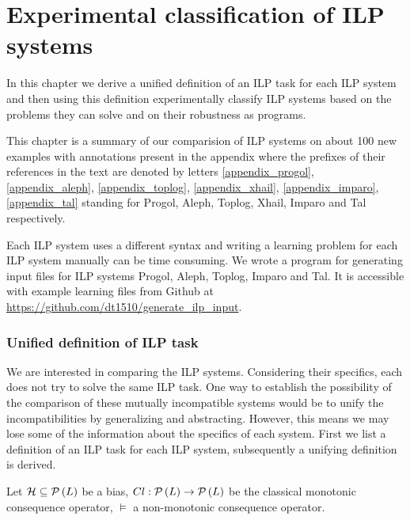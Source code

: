 \chapter{Experimental classification of ILP systems}\label{chap:classification_of_ilp_systems}
In this chapter we derive a unified definition of an ILP task for each ILP system and then using this definition experimentally classify ILP systems based on the problems they can solve and on their robustness as programs.

This chapter is a summary of our comparision of
ILP systems on about 100 new examples with annotations present in the appendix where the prefixes of their references in the text are denoted by letters
\ref{appendix_progol}, \ref{appendix_aleph}, \ref{appendix_toplog}, \ref{appendix_xhail}, \ref{appendix_imparo}, \ref{appendix_tal} standing for
Progol, Aleph, Toplog, Xhail, Imparo and Tal respectively.

Each ILP system uses a different syntax and writing a learning problem for each ILP system manually can be time consuming. We wrote a program  for generating input files for ILP systems Progol, Aleph, Toplog, Imparo and Tal. It is accessible with example learning files from Github at 
\url{https://github.com/dt1510/generate_ilp_input}.

\subsection{Unified definition of ILP task}\label{unified_definition}
We are interested in comparing the ILP systems. Considering their specifics, each does not try to solve the same ILP task. One way to establish the possibility of the comparison of these mutually incompatible systems would be to unify the incompatibilities by generalizing and abstracting. However, this means we may lose some of the information about the specifics of each system. First we list a definition of an ILP task for each ILP system, subsequently a unifying definition is derived.

Let $\mathcal{H} \subseteq \mathcal{P} \left({ L }\right)$ be a bias, $Cl:\mathcal{P} \left({ L }\right) \to \mathcal{P} \left({ L }\right)$ be the classical monotonic consequence operator, $\models$ a non-monotonic consequence operator.

